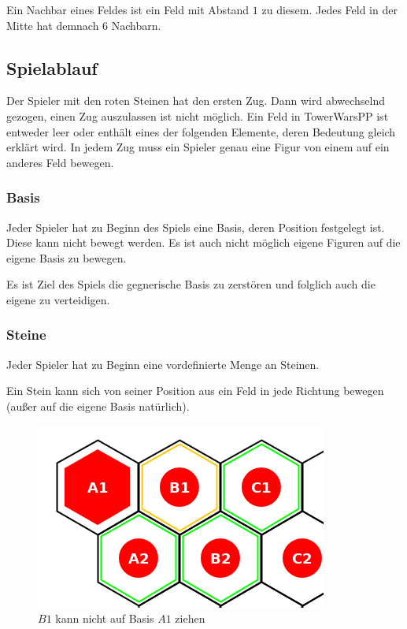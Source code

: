 Ein Nachbar eines Feldes ist ein Feld mit Abstand $1$ zu diesem. Jedes Feld in der Mitte hat demnach $6$ Nachbarn.

\subsection*{Spielablauf}
Der Spieler mit den roten Steinen hat den ersten Zug. Dann wird abwechselnd gezogen, einen Zug auszulassen ist nicht möglich. Ein Feld in TowerWarsPP ist entweder leer oder enthält eines der folgenden Elemente, deren Bedeutung gleich erklärt wird. In jedem Zug muss ein Spieler genau eine Figur von einem auf ein anderes Feld bewegen.

\subsubsection*{Basis}
Jeder Spieler hat zu Beginn des Spiels eine Basis, deren Position festgelegt ist. Diese kann nicht bewegt werden. Es ist auch nicht möglich eigene Figuren auf die eigene Basis zu bewegen.

Es ist Ziel des Spiels die gegnerische Basis zu zerstören und folglich auch die eigene zu verteidigen.

\subsubsection*{Steine}
Jeder Spieler hat zu Beginn eine vordefinierte Menge an Steinen. 

Ein Stein kann sich von seiner Position aus ein Feld in jede Richtung bewegen (außer auf die eigene Basis natürlich).
\begin{figure}[ht]
\begin{center}
\includegraphics[scale=0.25]{graphic/token-nobase.png}
\end{center}
\caption*{$B1$ kann nicht auf Basis $A1$ ziehen}
\end{figure}

